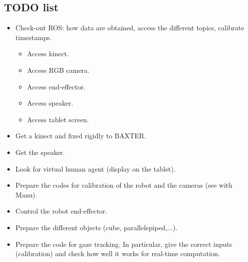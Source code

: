 \documentclass[11pt,a4paper]{article}
\begin{document}
\subsection{TODO list}
\begin{itemize}
\item Check-out ROS: how data are obtained, access the different topics, calibrate timestamps.
\begin{itemize}
\item Access kinect.
\item Access RGB camera.
\item Access end-effector.
\item Access speaker.
\item Access tablet screen.
\end{itemize}
\item Get a kinect and fixed rigidly to BAXTER.
\item Get the speaker.
\item Look for virtual human agent (display on the tablet).
\item Prepare the codes for calibration of the robot and the cameras (see with Manu).
\item Control the robot end-effector.
\item Prepare the different objects (cube, parallelepiped,...). 
\item Prepare the code for gaze tracking. In particular, give the correct inputs (calibration) and check how well it works for real-time computation.
\end{itemize}

\clearpage
\end{document}
